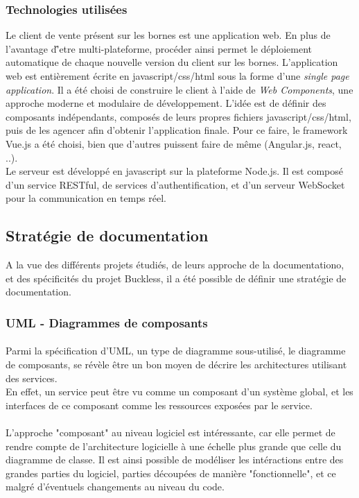     \subsubsection{Technologies utilisées}
        Le client de vente présent sur les bornes est une application web. En plus de l'avantage d'̂etre
        multi-plateforme, procéder ainsi permet le déploiement automatique de chaque nouvelle version
        du client sur les bornes. L'application web est entièrement écrite en javascript/css/html
        sous la forme d'une \textit{single page application}. Il a été choisi de construire le
        client à l'aide de \textit{Web Components}, une approche moderne et modulaire de développement.
        L'idée est de définir des composants indépendants, composés de leurs propres fichiers javascript/css/html,
        puis de les agencer afin d'obtenir l'application finale. Pour ce faire, le framework Vue.js
        a été choisi, bien que d'autres puissent faire de même (Angular.js, react, ..).\\
        Le serveur est développé en javascript sur la plateforme Node.js. Il est composé d'un service
        RESTful, de services d'authentification, et d'un serveur WebSocket pour la communication en
        temps réel.


\subsection{Stratégie de documentation}
    A la vue des différents projets étudiés, de leurs approche de la documentationo, et des
    spécificités du projet Buckless, il a été possible de définir une stratégie de documentation.


    \subsubsection{UML - Diagrammes de composants}
        \paragraph{}
            Parmi la spécification d'UML, un type de diagramme sous-utilisé, le diagramme de composants,
            se révèle être un bon moyen de décrire les architectures utilisant des services.\\
            En effet, un service peut être vu comme un composant d'un système global, et les interfaces
            de ce composant comme les ressources exposées par le service.

        \paragraph{}
            L'approche "composant" au niveau logiciel est intéressante, car elle permet de rendre compte
            de l'architecture logicielle à une échelle plus grande que celle du diagramme de classe.
            Il est ainsi possible de modéliser les intéractions entre des grandes parties du logiciel,
            parties découpées de manière "fonctionnelle", et ce malgré d'éventuels changements au niveau
            du code.

